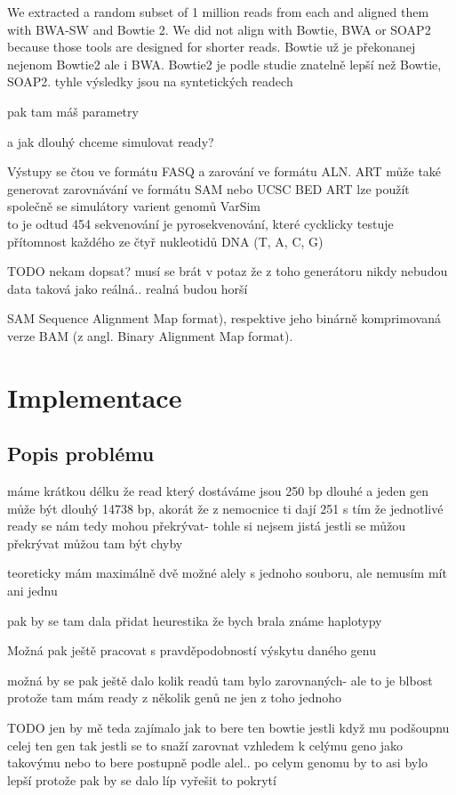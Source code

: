 \documentclass[czech,DP]{thesiskiv}
\numberwithin{equation}{section}
\begin{document}
 We extracted a random subset of 1 million reads from each and aligned them with BWA-SW and Bowtie 2. We did not align with Bowtie, BWA or SOAP2 because those tools are designed for shorter reads.
Bowtie už je překonanej nejenom Bowtie2 ale i BWA.
Bowtie2 je podle studie znatelně lepší než Bowtie, SOAP2.
tyhle výsledky jsou na syntetických readech


pak tam máš parametry 

a jak dlouhý chceme simulovat ready? 

Výstupy se čtou ve formátu FASQ a zarování ve formátu ALN. 
ART může také generovat zarovnávání ve formátu SAM nebo UCSC BED
ART lze použít společně se simulátory varient genomů VarSim 
\\
to je odtud %
454 sekvenování je pyrosekvenování, které cycklicky testuje přítomnost každého ze čtyř nukleotidů DNA (T, A, C, G)


TODO nekam dopsat? musí se brát v potaz že z toho generátoru nikdy nebudou data taková jako reálná.. realná budou horší 


SAM Sequence Alignment Map format), respektive jeho binárně
komprimovaná verze BAM (z angl. Binary Alignment Map format).


\chapter{Implementace}
\section{Popis problému}
máme krátkou délku
že read který dostáváme jsou 250 bp dlouhé a jeden gen může být dlouhý 14738 bp, akorát že z nemocnice ti dají 251
s tím že jednotlivé ready se nám tedy mohou překrývat- tohle si nejsem jistá jestli se můžou překrývat
můžou tam být chyby

teoreticky mám maximálně dvě možné alely s jednoho souboru, ale nemusím mít ani jednu 

pak by se tam dala přidat heurestika že bych brala známe haplotypy

Možná pak ještě pracovat s pravděpodobností výskytu daného genu

možná by se pak ještě dalo kolik readů tam bylo zarovnaných- ale to je blbost protože tam mám ready z několik genů ne jen z toho jednoho 

TODO jen by mě teda zajímalo jak to bere ten bowtie jestli když mu podšoupnu celej ten gen tak jestli se to snaží zarovnat vzhledem k celýmu geno jako takovýmu nebo to bere postupně podle alel.. 
po celym genomu by to asi bylo lepší protože pak by se dalo líp vyřešit to pokrytí 
\end{document}
